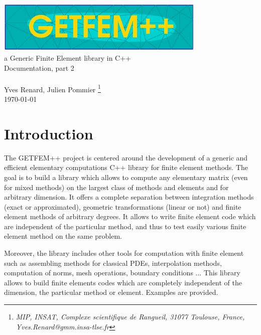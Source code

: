 \documentclass[11pt,a4paper]{article}
\begin{document}
\begin{center}
  \includegraphics[width=10cm,angle=0]{getfemlogo.eps}\\[0.2cm]
  a Generic Finite Element library in C++ \\[0.5cm]
  {\LARGE Documentation, part \Huge 2} \\[0.5cm]
   \\[0.5cm]
  { \large Yves {\sc Renard}, Julien {\sc Pommier} \footnote{ \it MIP, INSAT, Complexe scientifique de Rangueil, 31077 Toulouse, France, Yves.Renard@gmm.insa-tlse.fr } } \\[1.0cm]
  \today \\[1.0cm]
\end{center}




\section*{Introduction}


The GETFEM++ project is centered around the development of a generic and efficient elementary computations C++ library for finite element methods. The goal is to build a library which allows to compute any elementary matrix (even for mixed methods) on the largest class of methods and elements and for arbitrary dimension. It offers a complete separation between integration methods (exact or approximated), geometric transformations (linear or not) and finite element methods of arbitrary degrees. It allows to write finite element code which are independent of the particular method, and thus to test easily various finite element method on the same problem.

 Moreover, the library includes other tools for computation with finite element such as assembling methods for classical PDEs, interpolation methods, computation of norms, mesh operations, boundary conditions ... This library allows to build finite elements codes which are completely independent of the dimension, the particular method or element. Examples are provided.\\[2cm]

\end{document}
